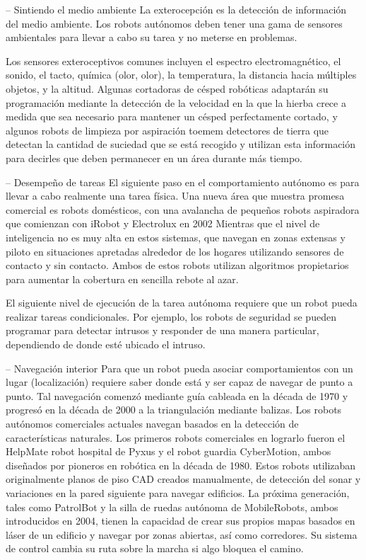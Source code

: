 -- Sintiendo el medio ambiente
La exterocepción es la detección de información del medio ambiente. Los robots autónomos deben tener una gama de sensores ambientales para llevar a cabo su tarea y no meterse en problemas. 

Los sensores exteroceptivos comunes incluyen el espectro electromagnético, el sonido, el tacto, química (olor, olor), la temperatura, la distancia hacia múltiples objetos, y la altitud. 
Algunas cortadoras de césped robóticas adaptarán su programación mediante la detección de la velocidad en la que la hierba crece a medida que sea necesario para mantener un césped perfectamente cortado, y algunos robots de limpieza por aspiración toemem detectores de tierra que detectan la cantidad de suciedad que se está recogido y utilizan esta información para decirles que deben permanecer en un área durante más tiempo. 

-- Desempeño de tareas 
El siguiente paso en el comportamiento autónomo es para llevar a cabo realmente una tarea física. Una nueva área que muestra promesa comercial es robots domésticos, con una avalancha de pequeños robots aspiradora que comienzan con iRobot y Electrolux en 2002 Mientras que el nivel de inteligencia no es muy alta en estos sistemas, que navegan en zonas extensas y piloto en situaciones apretadas alrededor de los hogares utilizando sensores de contacto y sin contacto. Ambos de estos robots utilizan algoritmos propietarios para aumentar la cobertura en sencilla rebote al azar. 

El siguiente nivel de ejecución de la tarea autónoma requiere que un robot pueda realizar tareas condicionales. Por ejemplo, los robots de seguridad se pueden programar para detectar intrusos y responder de una manera particular, dependiendo de donde esté ubicado el intruso.

-- Navegación interior 
Para que un robot pueda asociar comportamientos con un lugar (localización) requiere saber donde está y ser capaz de navegar de punto a punto. Tal navegación comenzó mediante guía cableada en la década de 1970 y progresó en la década de 2000 a la triangulación mediante balizas. Los robots autónomos comerciales actuales navegan basados en la detección de características naturales. Los primeros robots comerciales en lograrlo fueron el HelpMate robot hospital de Pyxus y el robot guardia CyberMotion, ambos diseñados por pioneros en robótica en la década de 1980. Estos robots utilizaban originalmente planos de piso CAD creados manualmente, de detección del sonar y variaciones en la pared siguiente para navegar edificios. La próxima generación, tales como PatrolBot y la silla de ruedas autónoma de MobileRobots, ambos introducidos en 2004, tienen la capacidad de crear sus propios mapas basados ​​en láser de un edificio y navegar por zonas abiertas, así como corredores. Su sistema de control cambia su ruta sobre la marcha si algo bloquea el camino.

